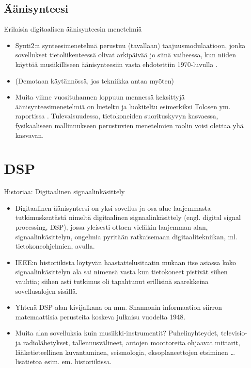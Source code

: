 \documentclass[pdf,10pt,handout]{beamer}
\begin{document}
\subsection{Äänisynteesi}
\begin{frame}{Erilaisia digitaalisen äänisynteesin menetelmiä}
\begin{itemize}
\item
  Synti2:n synteesimenetelmä perustuu (tavallaan) taajuusmodulaatioon,
  jonka sovellukset tietoliikenteessä olivat arkipäivää jo siinä
  vaiheessa, kun niiden käyttöä musiikilliseen äänisynteesiin vasta
  ehdotettiin 1970-luvulla \cite{chowning1973fm}.

\item[]
  (Demotaan käytännössä, jos tekniikka antaa myöten)

\item
  Muita viime vuosituhannen loppuun mennessä keksittyjä
  äänisynteesimenetelmiä on lueteltu ja luokiteltu esimerkiksi Tolosen
  ym. raportissa \cite{TolonenEtal1998evaluation}. Tulevaisuudessa,
  tietokoneiden suorituskyvyn kasvaessa, fysikaaliseen mallinnukseen
  perustuvien menetelmien roolin voisi olettaa yhä kasvavan.

\end{itemize}

\end{frame}

\section{DSP}
\begin{frame}{Historiaa: Digitaalinen signaalinkäsittely}
  \begin{itemize}
    \item
  Digitaalinen äänisynteesi on yksi sovellus ja osa-alue laajemmasta
  tutkimuskentästä nimeltä digitaalinen signaalinkäsittely
  (engl. digital signal processing, DSP), jossa yleisesti ottaen
  vieläkin laajemman alan, signaalinkäsittelyn, ongelmia pyritään
  ratkaisemaan digitaalitekniikan, ml. tietokoneohjelmien,
  avulla.
\item
  IEEE:n historiikista \cite{nebeker1998signalprocessing} löytyvän
  haastattelusitaatin mukaan itse asiassa koko signaalinkäsittelyn ala
  sai nimensä vasta kun tietokoneet pistivät siihen vauhtia; siihen
  asti tutkimus oli tapahtunut erillisinä saarekkeina sovellusalojen
  sisällä.

\item
  Yhtenä DSP-alan kivijalkana on mm. Shannonin informaation siirron
  matemaattisia perusteita koskeva julkaisu
  \cite{shannon48amathematical} vuodelta 1948.

\item
  Muita alan sovelluksia kuin musiikki-instrumentit? Puhelinyhteydet,
  televisio- ja radiolähetykset, tallennusvälineet, autojen
  moottoreita ohjaavat mittarit, lääketieteellinen kuvantaminen,
  seismologia, eksoplaneettojen etsiminen \ldots lisätietoa esim. em.
  historiikissa.
  \end{itemize}
  
\end{frame}
\end{document}
